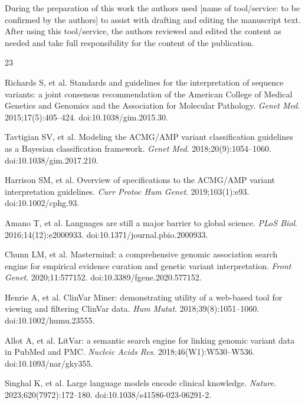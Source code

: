 \documentclass[preprint,12pt]{elsarticle}
\begin{document}
During the preparation of this work the authors used [name of
tool/service: to be confirmed by the authors] to assist with drafting
and editing the manuscript text. After using this tool/service, the
authors reviewed and edited the content as needed and take full
responsibility for the content of the publication.

\begin{thebibliography}{23}
\providecommand{\natexlab}[1]{#1}
\providecommand{\url}[1]{\texttt{#1}}

Richards S, et al.
\newblock Standards and guidelines for the interpretation of sequence
  variants: a joint consensus recommendation of the American College of
  Medical Genetics and Genomics and the Association for Molecular
  Pathology.
\newblock \emph{Genet Med}. 2015;17(5):405--424.
\newblock doi:10.1038/gim.2015.30.

Tavtigian SV, et al.
\newblock Modeling the ACMG/AMP variant classification guidelines as a
  Bayesian classification framework.
\newblock \emph{Genet Med}. 2018;20(9):1054--1060.
\newblock doi:10.1038/gim.2017.210.

Harrison SM, et al.
\newblock Overview of specifications to the ACMG/AMP variant
  interpretation guidelines.
\newblock \emph{Curr Protoc Hum Genet}. 2019;103(1):e93.
\newblock doi:10.1002/cphg.93.

Amano T, et al.
\newblock Languages are still a major barrier to global science.
\newblock \emph{PLoS Biol}. 2016;14(12):e2000933.
\newblock doi:10.1371/journal.pbio.2000933.

Chunn LM, et al.
\newblock Mastermind: a comprehensive genomic association search engine
  for empirical evidence curation and genetic variant interpretation.
\newblock \emph{Front Genet}. 2020;11:577152.
\newblock doi:10.3389/fgene.2020.577152.

Henrie A, et al.
\newblock ClinVar Miner: demonstrating utility of a web-based tool for
  viewing and filtering ClinVar data.
\newblock \emph{Hum Mutat}. 2018;39(8):1051--1060.
\newblock doi:10.1002/humu.23555.

Allot A, et al.
\newblock LitVar: a semantic search engine for linking genomic variant
  data in PubMed and PMC.
\newblock \emph{Nucleic Acids Res}. 2018;46(W1):W530--W536.
\newblock doi:10.1093/nar/gky355.

Singhal K, et al.
\newblock Large language models encode clinical knowledge.
\newblock \emph{Nature}. 2023;620(7972):172--180.
\newblock doi:10.1038/s41586-023-06291-2.


\end{thebibliography}
\end{document}
